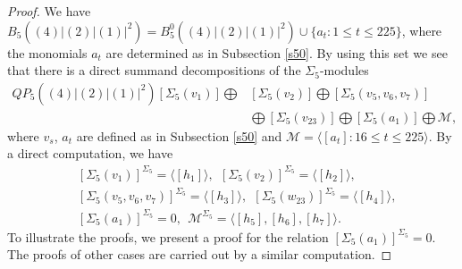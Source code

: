 \documentclass[reqno]{amsart}
\theoremstyle{plain}
\theoremstyle{definition}
\theoremstyle{plain}
\theoremstyle{definition}
\numberwithin{equation}{section}
\begin{document}
\begin{proof}
We have $B_5((4)|(2)|(1)|^2)= B_5^0((4)|(2)|(1)|^2)\cup\{a_t:1\leqslant t \leqslant 225\}$, where the monomials $a_t$ are determined as in Subsection \ref{s50}. By using this set we see that there is a direct summand decompositions of the $\Sigma_5$-modules
\begin{align*} 
QP_5((4)|(2)|(1)|^2) [\Sigma_5(v_1)]\bigoplus&[\Sigma_5(v_2)]\bigoplus[\Sigma_5(v_5,v_6,v_7)]\\
&\bigoplus[\Sigma_5(v_{23})]\bigoplus[\Sigma_5(a_1)]\bigoplus \mathcal M,
\end{align*}
where $v_s$, $a_t$ are defined as in Subsection \ref{s50} and $\mathcal M = \langle [a_t]: 16 \leqslant t \leqslant 225\rangle$. By a direct computation, we have 
\begin{align*}&[\Sigma_5(v_1)]^{\Sigma_5} = \langle [h_1]\rangle,\ \ [\Sigma_5(v_2)]^{\Sigma_5} = \langle [h_2]\rangle,\\
&[\Sigma_5(v_5,v_6,v_7)]^{\Sigma_5} = \langle [h_3]\rangle,\ \ [\Sigma_5(w_{23})]^{\Sigma_5} = \langle [h_4]\rangle,\\
&[\Sigma_5(a_1)]^{\Sigma_5} = 0,\ \ \mathcal M^{\Sigma_5} = \langle [h_5],[h_6],[h_7]\rangle.
\end{align*}
To illustrate the proofs, we present a proof for the relation $[\Sigma_5(a_1)]^{\Sigma_5} = 0$. The proofs of other cases are carried out by a similar computation.


\end{proof}
\end{document}
